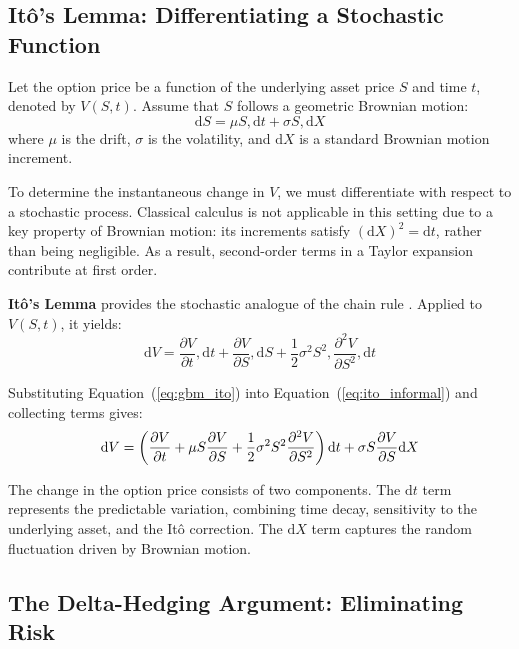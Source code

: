 \documentclass[12pt]{article}
\begin{document}
\subsection{It\^o's Lemma: Differentiating a Stochastic Function}
\label{sec:ito}

Let the option price be a function of the underlying asset price $S$ and time $t$, denoted by $V(S,t)$. Assume that $S$ follows a geometric Brownian motion:
\begin{equation}
\mathrm{d}S = \mu S,\mathrm{d}t + \sigma S,\mathrm{d}X
\label{eq:gbm_ito}
\end{equation}
where $\mu$ is the drift, $\sigma$ is the volatility, and $\mathrm{d}X$ is a standard Brownian motion increment.

To determine the instantaneous change in $V$, we must differentiate with respect to a stochastic process. Classical calculus is not applicable in this setting due to a key property of Brownian motion: its increments satisfy $(\mathrm{d}X)^2 = \mathrm{d}t$, rather than being negligible. As a result, second-order terms in a Taylor expansion contribute at first order.

\textbf{It\^o's Lemma} provides the stochastic analogue of the chain rule \cite{shreve2004stochastic}. Applied to $V(S,t)$, it yields:
\begin{equation}
\mathrm{d}V =
\frac{\partial V}{\partial t},\mathrm{d}t
+ \frac{\partial V}{\partial S},\mathrm{d}S
+ \frac{1}{2}\sigma^2 S^2,\frac{\partial^2 V}{\partial S^2},\mathrm{d}t
\label{eq:ito_informal}
\end{equation}

Substituting Equation~(\ref{eq:gbm_ito}) into Equation~(\ref{eq:ito_informal}) and collecting terms gives:
\begin{equation}
\mathrm{d}V = \left(\frac{\partial V}{\partial t}
+ \mu S\frac{\partial V}{\partial S}
+ \frac{1}{2}\sigma^2 S^2 \frac{\partial^2 V}{\partial S^2}\right)\mathrm{d}t
+ \sigma S\frac{\partial V}{\partial S} \space\mathrm{d}X
\label{eq:ito}
\end{equation}

The change in the option price consists of two components. The $\mathrm{d}t$ term represents the predictable variation, combining time decay, sensitivity to the underlying asset, and the It\^o correction. The $\mathrm{d}X$ term captures the random fluctuation driven by Brownian motion.

\subsection{The Delta-Hedging Argument: Eliminating Risk}
\label{sec:hedge}
\end{document}
